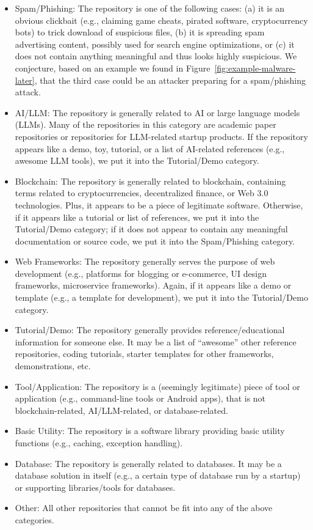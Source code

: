 \begin{itemize}[leftmargin=15pt]
    \item \textsf{Spam/Phishing}: 
    The repository is one of the following cases: (a) it is an obvious clickbait (e.g., claiming game cheats, pirated software, cryptocurrency bots) to trick download of suspicious files, (b) it is spreading spam advertising content, possibly used for search engine optimizations, or (c) it does not contain anything meaningful and thus looks highly suspicious. We conjecture, based on an example we found in Figure~\ref{fig:example-malware-later}, that the third case could be an attacker preparing for a spam/phishing attack.
    \item \textsf{AI/LLM}:
    The repository is generally related to AI or large language models (LLMs). Many of the repositories in this category are academic paper repositories or repositories for LLM-related startup products. If the repository appears like a demo, toy, tutorial, or a list of AI-related references (e.g., awesome LLM tools), we put it into the \textsf{Tutorial/Demo} category.
    \item \textsf{Blockchain}: The repository is generally related to blockchain, containing terms related to cryptocurrencies, decentralized finance, or Web 3.0 technologies. Plus, it appears to be a piece of legitimate software. Otherwise, if it appears like a tutorial or list of references, we put it into the \textsf{Tutorial/Demo} category; if it does not appear to contain any meaningful documentation or source code, we put it into the \textsf{Spam/Phishing} category.
    \item \textsf{Web Frameworks}: The repository generally serves the purpose of web development (e.g., platforms for blogging or e-commerce, UI design frameworks, microservice frameworks). Again, if it appears like a demo or template (e.g., a template for  development), we put it into the \textsf{Tutorial/Demo} category.
    \item \textsf{Tutorial/Demo}: The repository generally provides reference/educational information for someone else. It may be a list of ``awesome'' other reference repositories, coding tutorials, starter templates for other frameworks, demonstrations, etc.
    \item \textsf{Tool/Application}: The repository is a (seemingly legitimate) piece of tool or application (e.g., command-line tools or Android apps), that is not blockchain-related, AI/LLM-related, or database-related.
    \item \textsf{Basic Utility}: The repository is a software library providing basic utility functions (e.g., caching, exception handling).
    \item \textsf{Database}: The repository is generally related to databases. It may be a database solution in itself (e.g., a certain type of database run by a startup) or supporting libraries/tools for databases.
    \item \textsf{Other}: All other repositories that cannot be fit into any of the above categories.
\end{itemize}

